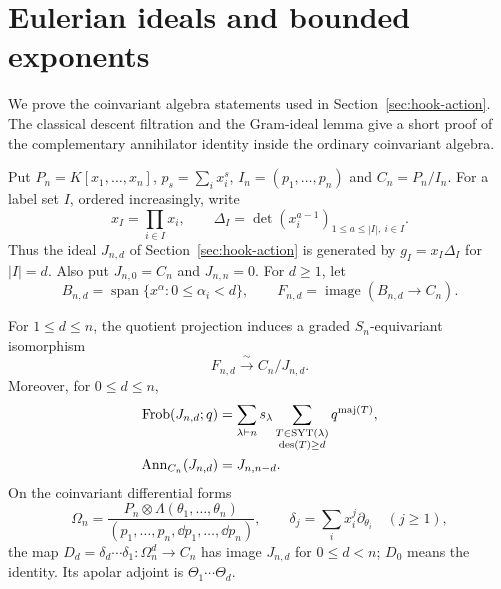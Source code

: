 \section{Eulerian ideals and bounded exponents}
\label{app:eulerian-foundations}

We prove the coinvariant algebra statements used in
Section~\ref{sec:hook-action}.  The classical descent filtration and
the Gram-ideal lemma give a short proof of the complementary
annihilator identity inside the ordinary coinvariant algebra.

Put $P_n=K[x_1,\ldots,x_n]$, $p_s=\sum_i x_i^s$,
$I_n=(p_1,\ldots,p_n)$ and $C_n=P_n/I_n$.
For a label set $I$, ordered increasingly, write
\[
 x_I=\prod_{i\in I}x_i,\qquad
 \Delta_I=\det(x_i^{a-1})_{1\le a\le |I|,\ i\in I}.
\]
Thus the ideal $J_{n,d}$ of Section~\ref{sec:hook-action} is
generated by $g_I=x_I\Delta_I$ for $|I|=d$.
Also put $J_{n,0}=C_n$ and $J_{n,n}=0$.
For $d\ge1$, let
\[
 B_{n,d}=\operatorname{span}\{x^\alpha:0\le\alpha_i<d\},
 \qquad F_{n,d}=\operatorname{image}(B_{n,d}\longrightarrow C_n).
\]

\begin{proposition}
\label{prop:standalone-eulerian-foundations}
For $1\le d\le n$, the quotient projection induces a graded
$S_n$-equivariant isomorphism
\begin{equation}\label{eq:standalone-eulerian-complement}
 F_{n,d}\xrightarrow{\ \sim\ } C_n/J_{n,d}.
\end{equation}
Moreover, for $0\le d\le n$,
\begin{align}
 \operatorname{Frob}(J_{n,d};q)
 &=\sum_{\lambda\vdash n}s_\lambda
       \sum_{\substack{T\in\operatorname{SYT}(\lambda)\\\operatorname{des}(T)\ge d}}
                        q^{\operatorname{maj}(T)},
       \label{eq:standalone-eulerian-character}\\
 \operatorname{Ann}_{C_n}(J_{n,d})&=J_{n,n-d}.
       \label{eq:standalone-eulerian-annihilator}
\end{align}
On the coinvariant differential forms
\[
 \Omega_n=
 \frac{P_n\otimes\Lambda(\theta_1,\ldots,\theta_n)}
 {(p_1,\ldots,p_n,\dd p_1,\ldots,\dd p_n)},
 \qquad \delta_j=\sum_i x_i^j\partial_{\theta_i}\quad(j\ge1),
\]
the map $D_d=\delta_d\cdots\delta_1:\Omega_n^d\to C_n$
has image $J_{n,d}$ for $0\le d<n$; $D_0$ means the identity.
Its apolar adjoint is $\Theta_1\cdots\Theta_d$.
\end{proposition}

